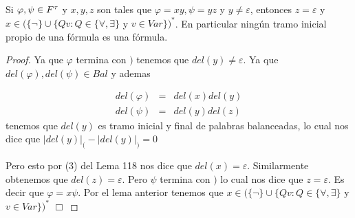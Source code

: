   \begin{proposition} \label{lemma_40}
    \PN Si $\varphi, \psi \in F^{\tau}$ y $x, y, z$ son tales que $\varphi = xy, \psi = yz$ y $y \neq \varepsilon$,
    entonces $z = \varepsilon$ y $x \in (\{\lnot\} \cup \{Qv: Q \in \{\forall, \exists\}$ y $v \in Var\})^{\ast}$. En
    particular ningún tramo inicial propio de una fórmula es una fórmula.
  \end{proposition}
  \begin{proof}
    Ya que $\varphi $ termina con $)$ tenemos que $del(y)\neq \varepsilon .$ Ya que $del(\varphi ),del(\psi )\in Bal$ y ademas

    \begin{eqnarray*}
      del(\varphi) &=& del(x)del(y) \\
      del(\psi) &=& del(y)del(z)
    \end{eqnarray*}
    \PN tenemos que $del(y)$ es tramo inicial y final de palabras balanceadas, lo cual nos dice que
    $\displaystyle \lvert del(y)\rvert_{(}-\lvert del(y)\rvert_{)}=0 $

    Pero esto por (3) del Lema 118 nos dice que $ del(x)=\varepsilon $. Similarmente obtenemos que $del(z)=\varepsilon $. Pero $\psi $ termina con $)$ lo cual nos dice que $z=\varepsilon $. Es decir que $ \varphi =x\psi $. Por el lema anterior tenemos que $x\in (\{\lnot \}\cup \{Qv:Q\in \{\forall ,\exists \}$ y $v\in Var\})^{\ast }$ $\Box$
  \end{proof}

